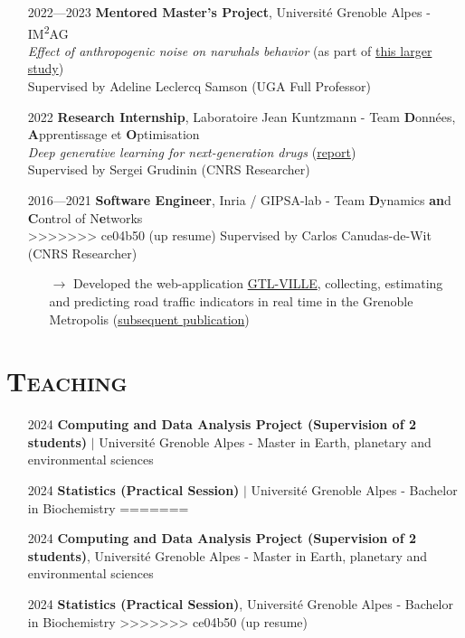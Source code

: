 \documentclass{article}
\begin{document}
\begin{itemize}
    \item[] 2022—2023 \tabto{2cm} \textbf{Mentored Master's Project}, Université Grenoble Alpes - IM\textsuperscript{2}AG \\[.1 cm]
    \tabto{2cm} \textit{Effect of anthropogenic noise on narwhals behavior} (as part of \href{https://doi.org/10.1126/sciadv.ade0440}{this larger study}) \\[.1 cm]
    \tabto{2cm} Supervised by Adeline Leclercq Samson (UGA Full Professor)
    
    \item[] 2022 \tabto{2cm} \textbf{Research Internship}, Laboratoire Jean Kuntzmann - Team \textbf{D}onnées, \textbf{A}pprentissage et \textbf{O}ptimisation \\[.1 cm]
    \tabto{2cm} \textit{Deep generative learning for next-generation drugs} (\href{https://vadmbertr.github.io/material/reports/Internship_report___Deep_generative_learning_for_next_generation_drugs.pdf}{report}) \\[.1 cm]
    \tabto{2cm} Supervised by Sergei Grudinin (CNRS Researcher)
    
    \item[] 2016—2021 \tabto{2cm} \textbf{Software Engineer}, Inria / GIPSA-lab - Team \textbf{D}ynamics \textbf{an}d \textbf{C}ontrol of N\textbf{e}tworks\\[.1 cm]
>>>>>>> ce04b50 (up resume)
    \tabto{2cm} Supervised by Carlos Canudas-de-Wit (CNRS Researcher)
    \vspace{-.1cm}
    \begin{itemize}[left=2cm]
        \item[$\rightarrow$] Developed the web-application \href{https://gtlville.inrialpes.fr/}{GTL-VILLE}, collecting, estimating and predicting road traffic indicators in real time in the Grenoble Metropolis (\href{https://hal.science/hal-03694936}{subsequent publication})
    \end{itemize}
\end{itemize}

\section*{\textsc{Teaching}}
\begin{itemize}
<<<<<<< HEAD
    \item[] 2024 \tabto{2cm} \textbf{Computing and Data Analysis Project (Supervision of 2 students)} $\vert$ Université Grenoble Alpes - \tabto{2cm} Master in Earth, planetary and environmental sciences
    \item[] 2024 \tabto{2cm} \textbf{Statistics (Practical Session)} $\vert$ Université Grenoble Alpes - Bachelor in Biochemistry
=======
    \item[] 2024 \tabto{2cm} \textbf{Computing and Data Analysis Project (Supervision of 2 students)}, Université Grenoble Alpes - \tabto{2cm} Master in Earth, planetary and environmental sciences
    \item[] 2024 \tabto{2cm} \textbf{Statistics (Practical Session)}, Université Grenoble Alpes - Bachelor in Biochemistry
>>>>>>> ce04b50 (up resume)
\end{itemize}
\end{document}

